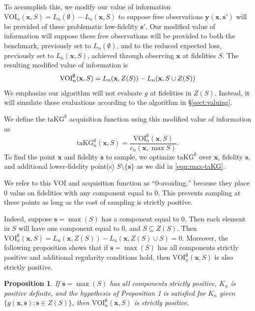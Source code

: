 \documentclass[letterpaper]{article}
\let\Section\S
\newcommand{\cost}{c}
\newcommand{\x}{\mathbf{x}}
\newcommand{\s}{\mathbf{s}}
\newcommand{\Y}{\mathbf{y}}
\newcommand{\T}{T}
\newcommand{\Z}{Z}
\renewcommand{\S}{S}
\newcommand{\loss}{L}
\newcommand{\taKGE}{\text{taKG}^\emptyset}
\newcommand{\VOIE}{\text{VOI}^\emptyset}
\newtheorem{proposition}{Proposition}
\numberwithin{equation}{section}
\newcommand{\sectn}[1]{\Section\ref{#1}}
\begin{document}
To accomplish this, we modify our value of information 
$\text{VOI}_n(\x,\S) = \loss_n(\emptyset) - \loss_n(\x,\S)$
to suppose free observations $\Y(\x,\s')$ will be provided of these problematic low-fidelity $\s'$.
  Our modified value of information will suppose these free observations will be provided to both the benchmark, previously set to $\loss_n(\emptyset)$, and to the reduced expected loss, previously set to $\loss_n(\x,\S)$, achieved through observing $\x$ at fidelities $\S$.
The resulting modified value of information is
\begin{equation*}
\VOIE_n(\x,\S) = \loss_n(\x,\Z(\S)) - \loss_n(\x,\S \cup \Z(\S)) \notag \\
\end{equation*}
We emphasize our algorithm will not evaluate $g$ at fidelities in $\Z(\S)$.  Instead, it will simulate these evaluations according to the algorithm in \sectn{sect:valuing}.

We define the $\taKGE$ acquisition function using this modified value of information as
\begin{equation}
\taKGE_n(\x, \S) = \frac{\VOIE_n(\x,\S)}{\cost_n(\x , \max \S)}.
\label{eqn:takg0}
\end{equation}
To find the point $\x$ and fidelity $\s$ to sample, we optimize $\taKGE$ over 
$\x$, fidelity $\s$, and additional lower-fidelity point(s) $\S \setminus \{\s\}$ as we did in \eqref{eqn:max-taKG}.

We refer to this VOI and acquisition function as ``0-avoiding,'' because they place 0 value on fidelities with any component equal to 0. 
This prevents sampling at these points as long as the cost of sampling is strictly positive.

Indeed, suppose $\s=\max(\S)$ has a component equal to $0$.  Then 
each element in $\S$ will have one component equal to $0$, and $\S \subseteq \Z(\S)$.
Then $\VOIE_n(\x,\S) = \loss_n(\x,\Z(\S)) - \loss_n(\x,\Z(\S)\cup \S) = 0$.
Moreover, the following proposition shows that if $\s=\max(\S)$ has all components strictly positive and additional regularity conditions hold, then $\VOIE_n(\x,\S)$ is also strictly positive.

\begin{proposition}
If $\s=\max(\S)$ has all components strictly positive, $K_n$ is positive definite, and the hypothesis of Proposition 1 is satisfied for $K_n$ given $\{ g(\x,\s) : \s \in \Z(\S) \}$, then $\VOIE_n(\x,\S)$ is strictly positive.
\end{proposition}
\end{document}
